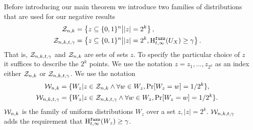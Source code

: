 
\label{sec:family}
Before introducing our main theorem we introduce two families of distributions that are used for our negative results
\begin{align*}
\mathcal{Z}_{n,k} &=\left\{z \subseteq \{0, 1\}^n\middle|  |z| = 2^k\right\},\\
\mathcal{Z}_{n,k,t,\gamma} &= \left\{z \subseteq \{0, 1\}^n\middle| |z| = 2^k,\mathrm{H}^{\mathtt{fuzz}}_{t,\infty}(U_X) \ge \gamma\right\}.
\end{align*}
That is, $\mathcal{Z}_{n,k,t,\gamma}$ and $\mathcal{Z}_{n,k}$ are sets of sets $z$. To specify the particular choice of $z$ it suffices to describe the $2^k$ points. We use the notation $z = z_{1},..., z_{2^k}$ as an index either $\mathcal{Z}_{n,k}$ or $\mathcal{Z}_{n,k,t,\gamma}$.
We use the notation 
\begin{align*}
\mathcal{W}_{n,k} &=\{W_z | z \in \mathcal{Z}_{n,k}  \wedge \forall w \in W_z, \Pr[W_z=w]=1/2^k\},\\
\mathcal{W}_{n,k,t,\gamma} &= \{W_z | z\in \mathcal{Z}_{n,k,t,\gamma} \wedge \forall w \in W_z, \Pr[W_z=w]=1/2^k\}.
\end{align*}
$\mathcal{W}_{n,k}$ is the family of uniform distributions $W_z$ over a set $z, |z|=2^k$.
$\mathcal{W}_{n,k,t,\gamma}$ adds the requirement that $\mathrm{H}^{\mathtt{fuzz}}_{t,\infty}(W_z)\ge\gamma$.  